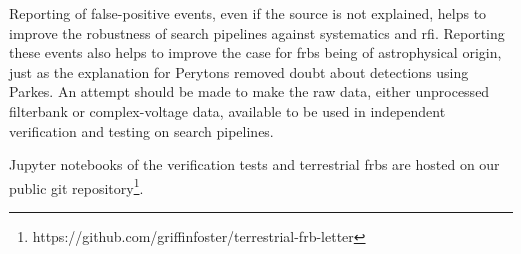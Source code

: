 \documentclass[a4paper,fleqn,usenatbib]{mnras}
\begin{document}
Reporting of false-positive events, even if the source is not explained, helps
to improve the robustness of search pipelines against systematics and \gls{rfi}.
Reporting these events also helps to improve the case for \glspl{frb} being of
astrophysical origin, just as the explanation for Perytons
\citep{2015MNRAS.451.3933P} removed doubt about detections using Parkes. An
attempt should be made to make the raw data, either unprocessed filterbank or
complex-voltage data, available to be used in independent verification and
testing on search pipelines.

Jupyter notebooks of the verification tests and terrestrial \glspl{frb} are
hosted on our public git
repository\footnote{https://github.com/griffinfoster/terrestrial-frb-letter}.


 

\bsp	%
\label{lastpage}
\end{document}
